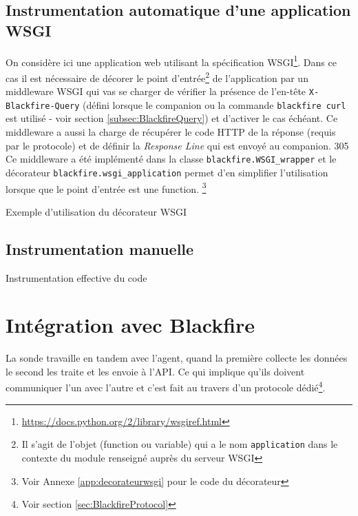 \section[Application WSGI]{Instrumentation automatique d'une application WSGI}
On considère ici une application web utilisant la spécification WSGI\footnote{\url{https://docs.python.org/2/library/wsgiref.html}}. Dans ce cas il est nécessaire de décorer le point d'entrée\footnote{Il s'agit de l'objet (function ou variable) qui a le nom \verb|application| dans le contexte du module renseigné auprès du serveur WSGI} de l'application par un middleware WSGI qui vas se charger de vérifier la présence de l'en-tête \verb|X-Blackfire-Query| (défini lorsque le \gls{companion} ou la commande \verb|blackfire curl| est utilisé - voir section \vref{subsec:BlackfireQuery}) et d'activer \Blackfire le cas échéant. Ce middleware a aussi la charge de récupérer le code HTTP de la réponse (requis par le protocole) et de définir la \emph{Response Line} qui est envoyé au companion.
305
Ce middleware a été implémenté dans la classe \verb|blackfire.WSGI_wrapper| et le décorateur \verb|blackfire.wsgi_application| permet d'en simplifier l'utilisation lorsque que le point d'entrée est une function. \footnote{Voir Annexe \vref{app:decorateurwsgi} pour le code du décorateur}

\begin{listing}[H]
\caption{Exemple d'utilisation du décorateur WSGI}
\end{listing}

\section{Instrumentation manuelle}


\begin{listing}[H]
\caption{Instrumentation effective du code}
\end{listing}

  \chapter[Intégration]{Intégration avec Blackfire}
  \label{chap:integration}
La sonde travaille en tandem avec l'agent, quand la première collecte les données le second les traite et les envoie à l'API. Ce qui implique qu'ils doivent communiquer l'un avec l'autre et c'est fait au travers d'un protocole dédié\footnote{Voir section \vref{sec:BlackfireProtocol}}.


